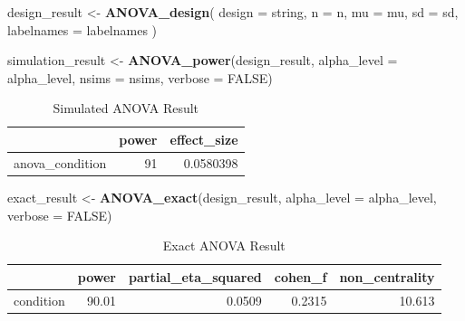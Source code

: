 \documentclass[]{book}
\newenvironment{Shaded}{\begin{snugshade}}{\end{snugshade}}
\newcommand{\DataTypeTok}[1]{\textcolor[rgb]{0.13,0.29,0.53}{#1}}
\newcommand{\KeywordTok}[1]{\textcolor[rgb]{0.13,0.29,0.53}{\textbf{#1}}}
\newcommand{\NormalTok}[1]{#1}
\newcommand{\OtherTok}[1]{\textcolor[rgb]{0.56,0.35,0.01}{#1}}
\newcommand{\StringTok}[1]{\textcolor[rgb]{0.31,0.60,0.02}{#1}}
\begin{document}
\begin{Shaded}
\begin{Highlighting}[]
\NormalTok{design_result <-}\StringTok{ }\KeywordTok{ANOVA_design}\NormalTok{(}
  \DataTypeTok{design =}\NormalTok{ string,}
  \DataTypeTok{n =}\NormalTok{ n,}
  \DataTypeTok{mu =}\NormalTok{ mu,}
  \DataTypeTok{sd =}\NormalTok{ sd,}
  \DataTypeTok{labelnames =}\NormalTok{ labelnames}
\NormalTok{  )}

\NormalTok{simulation_result <-}\StringTok{ }\KeywordTok{ANOVA_power}\NormalTok{(design_result, }
                                 \DataTypeTok{alpha_level =}\NormalTok{ alpha_level, }
                                 \DataTypeTok{nsims =}\NormalTok{ nsims,}
                                 \DataTypeTok{verbose =} \OtherTok{FALSE}\NormalTok{)}
\end{Highlighting}
\end{Shaded}

\begin{table}[t]

\caption{\label{tab:unnamed-chunk-16}Simulated ANOVA Result}
\centering
\begin{tabular}{l|r|r}
\hline
  & power & effect\_size\\
\hline
anova\_condition & 91 & 0.0580398\\
\hline
\end{tabular}
\end{table}

\begin{Shaded}
\begin{Highlighting}[]
\NormalTok{exact_result <-}\StringTok{ }\KeywordTok{ANOVA_exact}\NormalTok{(design_result,}
                            \DataTypeTok{alpha_level =}\NormalTok{ alpha_level,}
                            \DataTypeTok{verbose =} \OtherTok{FALSE}\NormalTok{)}
\end{Highlighting}
\end{Shaded}

\begin{table}[t]

\caption{\label{tab:unnamed-chunk-18}Exact ANOVA Result}
\centering
\begin{tabular}{l|r|r|r|r}
\hline
  & power & partial\_eta\_squared & cohen\_f & non\_centrality\\
\hline
condition & 90.01 & 0.0509 & 0.2315 & 10.613\\
\hline
\end{tabular}
\end{table}
\end{document}
